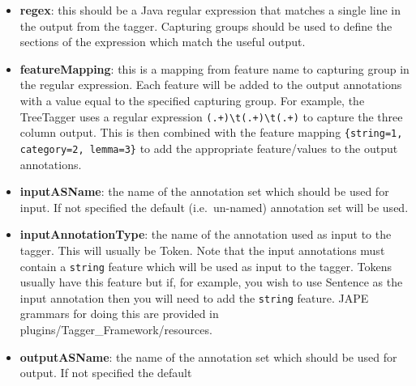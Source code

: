 \begin{itemize}
\begin{itemize}
         \verb|${feature}| which will be replaced by the value of the corresponding feature from the
         annotation.  The default template is \verb|${string}|, which simply passes the string feature of
         each annotation to the tagger.  Typical variants would be \verb|${string}\t${category}| for an
         entity tagger that requires the string and the part of speech tag for each token, separated by a
         tab\footnote{Java string escape sequences such as \textbackslash t will be decoded before the template is expanded.}.
         If a particular annotation does not have one of the specified features, the corresponding slot
         in the template will be left blank (i.e.\ replaced by an empty string).  It is only an error
         if a particular annotation contains \emph{none} of the features specified by the template.
      \item \textbf{regex}: this should be a Java regular expression that matches a single line in the output from the tagger.
         Capturing groups should be used to define the sections of the expression which match the useful output.
      \item \textbf{featureMapping}: this is a mapping from feature name to capturing group in the regular expression. Each
         feature will be added to the output annotations with a value equal to the specified capturing group. For example,
         the TreeTagger uses a regular expression \texttt{(.+)\textbackslash t(.+)\textbackslash t(.+)} to capture the three column output. This is
         then combined with the feature mapping \texttt{\{string=1, category=2, lemma=3\}} to add the appropriate
         feature/values to the output annotations.
      \item \textbf{inputASName}: the name of the annotation set which should be used for input. If not specified the default
         (i.e.\ un-named) annotation set will be used.
      \item \textbf{inputAnnotationType}: the name of the annotation used as input to the tagger. This will usually be Token. Note that the
         input annotations must contain a \texttt{string} feature which will be used as input to the tagger. Tokens usually have this
         feature but if, for example, you wish to use Sentence as the input annotation then you will need to add the \texttt{string}
         feature. JAPE grammars for doing this are provided in plugins/Tagger\_Framework/resources.
      \item \textbf{outputASName}: the name of the annotation set which should be used for output. If not specified the default

\end{itemize}
\end{itemize}
